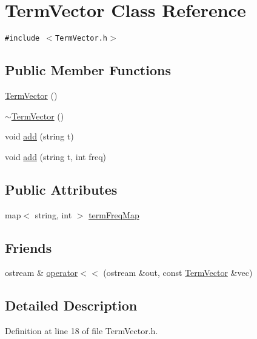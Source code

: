 \hypertarget{classTermVector}{
\section{TermVector Class Reference}
\label{classTermVector}
}
{\tt \#include $<$TermVector.h$>$}

\subsection*{Public Member Functions}
\begin{CompactItemize}
\item 
\hyperlink{classTermVector_77c2b9d27f5916a24f053c3a98e43ae6}{TermVector} ()
\item 
\hyperlink{classTermVector_3a04d9e2e7a3ab37725c5be509ab839a}{$\sim$TermVector} ()
\item 
void \hyperlink{classTermVector_170945bb374e075eb6ba5b4ca18ecb42}{add} (string t)
\item 
void \hyperlink{classTermVector_af6ec826119a4dce1077c3281129123a}{add} (string t, int freq)
\end{CompactItemize}
\subsection*{Public Attributes}
\begin{CompactItemize}
\item 
map$<$ string, int $>$ \hyperlink{classTermVector_dadbdea84c3f32d056cd31e8fb03ec0f}{termFreqMap}
\end{CompactItemize}
\subsection*{Friends}
\begin{CompactItemize}
\item 
ostream \& \hyperlink{classTermVector_e6d346b7ebb648c84dad5bd3ebfab12b}{operator$<$$<$} (ostream \&out, const \hyperlink{classTermVector}{TermVector} \&vec)
\end{CompactItemize}


\subsection{Detailed Description}


Definition at line 18 of file TermVector.h.

